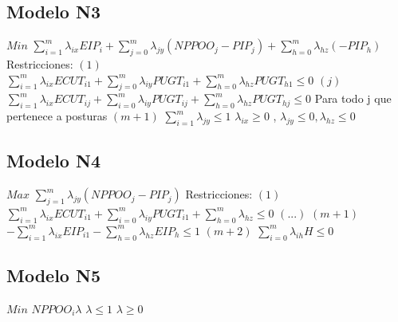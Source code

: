 \documentclass{llncs}
\begin{document}
\subsection{Modelo N3}
$Min$ $\sum_{i = 1}^{m} \lambda_{ix}EIP_{i} + \sum_{j = 0}^{m} \lambda_{jy}(NPPOO_{j}-PIP_{j}) + \sum_{h = 0}^{m} \lambda_{hz}(-PIP_{h})$
\newline
\newline
Restricciones:
\newline
$(1)$  $\sum_{i = 1}^{m} \lambda_{ix}ECUT_{i1} + \sum_{j = 0}^{m} \lambda_{iy}PUGT_{i1} + \sum_{h = 0}^{m}\lambda_{hz}PUGT_{h1}\leq 0$
\newline
$(j)$ $\sum_{i = 1}^{m} \lambda_{ix}ECUT_{ij} + \sum_{i = 0}^{m} \lambda_{iy}PUGT_{ij} + \sum_{h = 0}^{m}\lambda_{hz}PUGT_{hj} \leq 0 $
\newline
Para todo j que pertenece a posturas
\newline
\newline
$(m+1)$ $\sum_{i = 1}^{m} \lambda_{jy}  \leq 1$
\newline
\newline
$\lambda_{ix} \geq 0$ , $\lambda_{jy} \leq 0, \lambda_{hz} \leq 0$

\subsection{Modelo N4}
$Max$ $\sum_{j = 1}^{m} \lambda_{jy}(NPPOO_{j} - PIP_{j})$
\newline
\newline
Restricciones:
\newline
$(1)$  $\sum_{i = 1}^{m} \lambda_{ix}ECUT_{i1} + \sum_{i = 0}^{m} \lambda_{iy}PUGT_{i1} + \sum_{h = 0}^{m}\lambda_{hz} \leq 0$
\newline
$(...)$
\newline
$(m+1)$  $ - \sum_{i = 1}^{m} \lambda_{ix}EIP_{i1} - \sum_{h = 0}^{m}\lambda_{hz}EIP_{h} \leq 1$
\newline
$(m+2)$ $\sum_{i = 0}^{m} \lambda_{ih} H  \leq 0$

\subsection{Modelo N5}
$Min$ $NPPOO_{i}\lambda$
\newline
\newline
$\lambda \leq 1$
\newline
$\lambda \geq 0$
\end{document}
